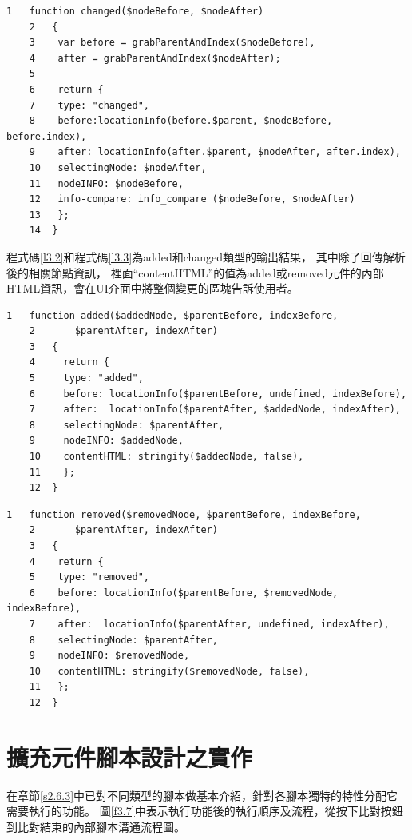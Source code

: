 \begin{lstlisting}[caption=比對輸出結果(changed類型), label={l3.1}]
    1   function changed($nodeBefore, $nodeAfter) 
    2   {
    3    var before = grabParentAndIndex($nodeBefore),
    4    after = grabParentAndIndex($nodeAfter);
    5
    6    return {
    7    type: "changed",
    8    before:locationInfo(before.$parent, $nodeBefore, before.index),
    9    after: locationInfo(after.$parent, $nodeAfter, after.index),
    10   selectingNode: $nodeAfter,
    11   nodeINFO: $nodeBefore,
    12   info-compare: info_compare ($nodeBefore, $nodeAfter)
    13   };
    14  }
\end{lstlisting}

程式碼\ref{l3.2}和程式碼\ref{l3.3}為added和changed類型的輸出結果，
其中除了回傳解析後的相關節點資訊，
裡面``contentHTML''的值為added或removed元件的內部HTML資訊，會在UI介面中將整個變更的區塊告訴使用者。

\begin{lstlisting}[caption=比對輸出結果(added類型), label={l3.2}]
    1   function added($addedNode, $parentBefore, indexBefore, 
    2       $parentAfter, indexAfter) 
    3   {
    4     return {
    5     type: "added",
    6     before: locationInfo($parentBefore, undefined, indexBefore),
    7     after:  locationInfo($parentAfter, $addedNode, indexAfter),
    8     selectingNode: $parentAfter,
    9     nodeINFO: $addedNode,
    10    contentHTML: stringify($addedNode, false),
    11    };
    12  }
\end{lstlisting}

\begin{lstlisting}[caption=比對輸出結果(removed類型), label={l3.3}]
    1   function removed($removedNode, $parentBefore, indexBefore, 
    2       $parentAfter, indexAfter) 
    3   {
    4    return {
    5    type: "removed",
    6    before: locationInfo($parentBefore, $removedNode, indexBefore),
    7    after:  locationInfo($parentAfter, undefined, indexAfter),
    8    selectingNode: $parentAfter,
    9    nodeINFO: $removedNode,
    10   contentHTML: stringify($removedNode, false),
    11   };
    12  }
\end{lstlisting}


\section{擴充元件腳本設計之實作}\label{s3.4}
\indent
在章節\ref{s2.6.3}中已對不同類型的腳本做基本介紹，針對各腳本獨特的特性分配它需要執行的功能。
圖\ref{f3.7}中表示執行功能後的執行順序及流程，從按下比對按鈕到比對結束的內部腳本溝通流程圖。

